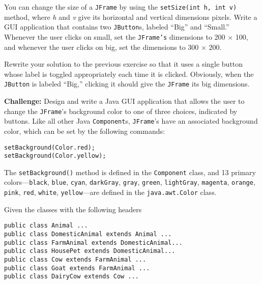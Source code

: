 \begin{EXRtwo}
\item  You can change the size of a {\tt JFrame} by using the
{\tt setSize(int h, int v)} method, where {\it h} and {\it v} give its horizontal and vertical
dimensions pixels.  Write a GUI application that 
contains two {\tt JButton}s, labeled ``Big'' and ``Small.'' Whenever
the user clicks on small, set the {\tt JFrame's} dimensions to
200 $\times$ 100, and whenever the user clicks on big, set the dimensions
to 300 $\times$ 200.

\item  Rewrite your solution to the previous exercise
so that it uses a single button whose label is toggled appropriately
each time it is clicked.  Obviously, when the {\tt JButton} is
labeled ``Big,'' clicking it should give the {\tt JFrame} its big
dimensions.


\item  {\bf Challenge:} Design and write a Java GUI application that allows 
the user to change the {\tt JFrame}'s background color to one of three choices,
indicated by buttons.  Like all other Java {\tt Component}s, {\tt JFrame}'s
have an associated background color, which can be set by the following
commands:

\begin{jjjlisting}
\begin{lstlisting}
setBackground(Color.red);
setBackground(Color.yellow);
\end{lstlisting}
\end{jjjlisting}

\noindent The {\tt setBackground()} method is defined in the
{\tt Component} class, and 13 primary colors---{\tt black}, {\tt blue},
{\tt cyan}, {\tt darkGray}, {\tt gray}, {\tt green}, {\tt lightGray}, 
\mbox{\tt magenta}, {\tt orange}, {\tt pink}, {\tt red}, {\tt white}, {\tt yellow}---are 
defined in the {\tt java.awt.Color} class.


\item Given the classes with the following headers
\begin{jjjlisting}
\begin{lstlisting}
public class Animal ...
public class DomesticAnimal extends Animal ...
public class FarmAnimal extends DomesticAnimal...
public class HousePet extends DomesticAnimal...
public class Cow extends FarmAnimal ...
public class Goat extends FarmAnimal ...
public class DairyCow extends Cow ...
\end{lstlisting}
\end{jjjlisting}


\end{EXRtwo}

